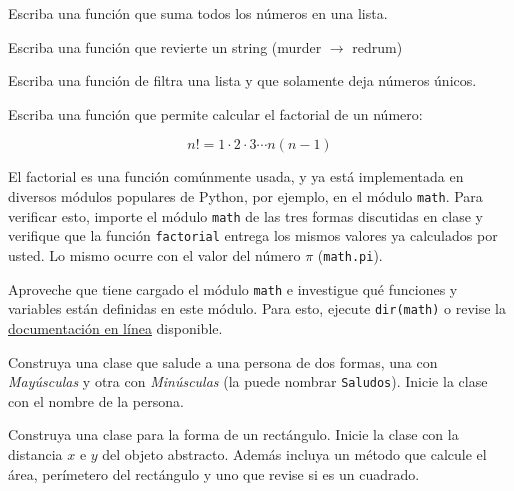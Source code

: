 \documentclass[11pt]{exam}
\begin{document}
\firstpageheadrule
\runningheadrule
{}
\cfoot{ }
\begin{flushleft}
\vspace{0.2in}

\vspace{0.25cm}
\end{flushleft}

\begin{questions}
\item Escriba una función que suma todos los números en una lista.
	
\item Escriba una función que revierte un string (murder $\rightarrow$ redrum) 

\item Escriba una función de filtra una lista y que solamente deja números 
únicos. 

\item Escriba una función que permite calcular el factorial de un número:

	$$ n! = 1\cdot 2\cdot 3 \cdots n(n-1) $$

\item El factorial es una función comúnmente usada, y ya está implementada en diversos módulos populares de Python, por ejemplo, en el módulo \texttt{math}. Para verificar esto, importe el módulo \texttt{math} de las tres formas discutidas en clase y verifique que la función \texttt{factorial} entrega los mismos valores ya calculados por usted. Lo mismo ocurre con el valor del número $\pi$ (\texttt{math.pi}). 

\item Aproveche que tiene cargado el módulo \texttt{math} e investigue qué funciones y variables están definidas en este módulo. Para esto, ejecute \texttt{dir(math)} o revise la \href{https://docs.python.org/2/library/math.html}{documentaci\'on en l\'inea} disponible.

\item Construya una clase que salude a una persona de dos formas, 
      una con \textit{Mayúsculas} y otra con \textit{Minúsculas} (la puede nombrar \texttt{Saludos}). 
      Inicie la clase con el nombre de la persona. 

\item Construya una clase para la forma de un rectángulo. Inicie la 
      clase con la distancia $x$ e $y$ del objeto abstracto. Además incluya un método
      que calcule el área, perímetero del rectángulo y uno que revise si es un cuadrado.


\end{questions}
\end{document}
